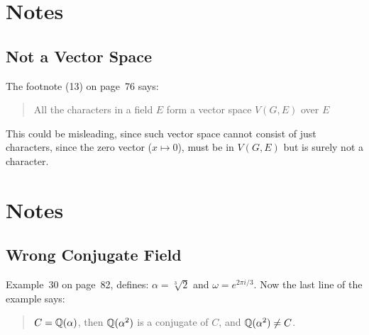 

\section{Notes}

\subsection{Not a Vector Space}

The footnote (13) on page~76 says:
\begin{quotation}
All the characters in a field $E$ form
a vector space \(V(G,E)\) over $E$ \mldots
\end{quotation}
This could be misleading, since such vector space cannot consist
of just characters, since the zero vector (\(x\mapsto 0\)),
must be in \(V(G,E)\) but is surely not a character.


\section{Notes}

\subsection{Wrong Conjugate Field}

Example~30 on page~82, defines: \(\alpha=\sqrt[3]{2}\) and
\(\omega = e^{2\pi i/3}\).
Now the last line of the example says:
\begin{quotation}
\(C=\mathbb{Q}(\alpha)\), then \(\mathbb{Q}(\alpha^2)\) is a conjugate of $C$,
and \(\mathbb{Q}(\alpha^2)\neq C\).
\end{quotation}

